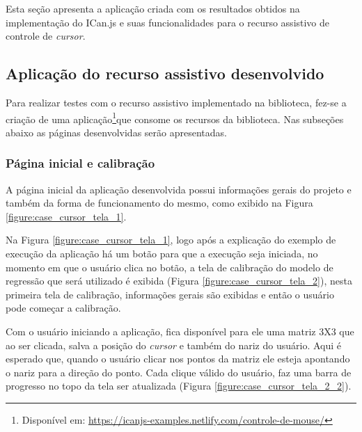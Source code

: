 \par Esta seção apresenta a aplicação criada com os resultados obtidos na implementação do ICan.js e suas funcionalidades para o recurso assistivo de controle de \textit{cursor}.

\subsection{Aplicação do recurso assistivo desenvolvido}

\par Para realizar testes com o recurso assistivo implementado na biblioteca, fez-se a criação de uma aplicação\footnote{Disponível em: \url{https://icanjs-examples.netlify.com/controle-de-mouse/}}que consome os recursos da biblioteca. Nas subseções abaixo as páginas desenvolvidas serão apresentadas.

\subsubsection{Página inicial e calibração}

\par A página inicial da aplicação desenvolvida possui informações gerais do projeto e também da forma de funcionamento do mesmo, como exibido na Figura \ref{figure:case_cursor_tela_1}.


\par Na Figura \ref{figure:case_cursor_tela_1}, logo após a explicação do exemplo de execução da aplicação há um botão para que a execução seja iniciada, no momento em que o usuário clica no botão, a tela de calibração do modelo de regressão que será utilizado é exibida (Figura \ref{figure:case_cursor_tela_2}), nesta primeira tela de calibração, informações gerais são exibidas e então o usuário pode começar a calibração.


\par Com o usuário iniciando a aplicação, fica disponível para ele uma matriz 3X3 que ao ser clicada, salva a posição do \textit{cursor} e também do nariz do usuário. Aqui é esperado que, quando o usuário clicar nos pontos da matriz ele esteja apontando o nariz para a direção do ponto. Cada clique válido do usuário, faz uma barra de progresso no topo da tela ser atualizada (Figura \ref{figure:case_cursor_tela_2_2}).

